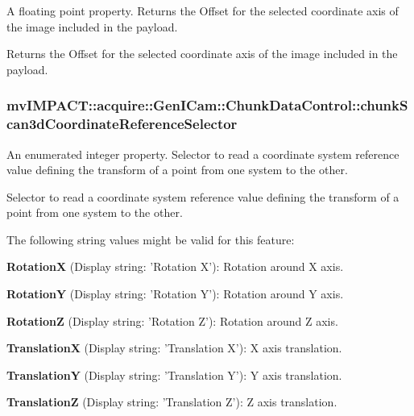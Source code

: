 A floating point property. Returns the Offset for the selected coordinate axis of the image included in the payload. 

Returns the Offset for the selected coordinate axis of the image included in the payload. \hypertarget{classmv_i_m_p_a_c_t_1_1acquire_1_1_gen_i_cam_1_1_chunk_data_control_aa1f8d5ac6f3f254800f33d0b57bddd18}{
\subsubsection[{chunk\+Scan3d\+Coordinate\+Reference\+Selector}]{ mv\+I\+M\+P\+A\+C\+T\+::acquire\+::\+Gen\+I\+Cam\+::\+Chunk\+Data\+Control\+::chunk\+Scan3d\+Coordinate\+Reference\+Selector}}\label{classmv_i_m_p_a_c_t_1_1acquire_1_1_gen_i_cam_1_1_chunk_data_control_aa1f8d5ac6f3f254800f33d0b57bddd18}


An enumerated integer property. Selector to read a coordinate system reference value defining the transform of a point from one system to the other. 

Selector to read a coordinate system reference value defining the transform of a point from one system to the other.

The following string values might be valid for this feature\+:
\begin{DoxyItemize}
\item {\bfseries Rotation\+X} (Display string\+: 'Rotation X')\+: Rotation around X axis.
\item {\bfseries Rotation\+Y} (Display string\+: 'Rotation Y')\+: Rotation around Y axis.
\item {\bfseries Rotation\+Z} (Display string\+: 'Rotation Z')\+: Rotation around Z axis.
\item {\bfseries Translation\+X} (Display string\+: 'Translation X')\+: X axis translation.
\item {\bfseries Translation\+Y} (Display string\+: 'Translation Y')\+: Y axis translation.
\item {\bfseries Translation\+Z} (Display string\+: 'Translation Z')\+: Z axis translation.
\end{DoxyItemize}

